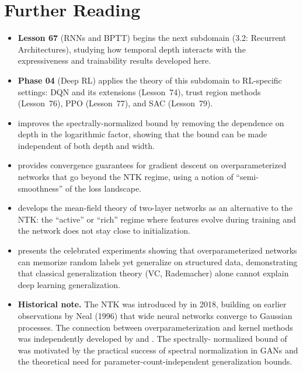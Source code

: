 \documentclass[11pt,a4paper]{article}
\begin{document}
\section{Further Reading}
\label{sec:further-reading}

\begin{itemize}
  \item \textbf{Lesson 67} (RNNs and BPTT) begins the next subdomain
    (3.2: Recurrent Architectures), studying how temporal depth
    interacts with the expressiveness and trainability results
    developed here.

  \item \textbf{Phase 04} (Deep RL) applies the theory of this
    subdomain to RL-specific settings: DQN and its extensions
    (Lesson~74), trust region methods (Lesson~76), PPO (Lesson~77),
    and SAC (Lesson~79).

  \item \citet{golowich2018} improves the spectrally-normalized bound
    by removing the dependence on depth in the logarithmic factor,
    showing that the bound can be made independent of both depth and
    width.

  \item \citet{allen-zhu2019} provides convergence guarantees for
    gradient descent on overparameterized networks that go beyond the
    NTK regime, using a notion of ``semi-smoothness'' of the loss
    landscape.

  \item \citet{chizat2018} develops the mean-field theory of
    two-layer networks as an alternative to the NTK: the ``active''
    or ``rich'' regime where features evolve during training and the
    network does not stay close to initialization.

  \item \citet{zhang2021} presents the celebrated experiments showing
    that overparameterized networks can memorize random labels yet
    generalize on structured data, demonstrating that classical
    generalization theory (VC, Rademacher) alone cannot explain
    deep learning generalization.

  \item \textbf{Historical note.}  The NTK was introduced by
    \citet{jacot2018} in 2018, building on earlier observations by
    Neal (1996) that wide neural networks converge to Gaussian
    processes.  The connection between overparameterization and
    kernel methods was independently developed by
    \citet{du2019} and \citet{allen-zhu2019}.  The spectrally-
    normalized bound of \citet{bartlett2017} was motivated by the
    practical success of spectral normalization in GANs and the
    theoretical need for parameter-count-independent generalization
    bounds.
\end{itemize}


\end{document}
